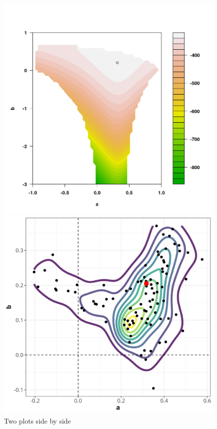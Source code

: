 \documentclass{article}
\numberwithin{equation}{section}
\begin{document}
\begin{figure}[H]
    \centering
    \begin{minipage}{0.55\textwidth}
        \centering
        \includegraphics[width=\textwidth]{plots/Rplot01.png}
    \end{minipage}
    \hfill
    \begin{minipage}{0.44\textwidth}
        \centering
        \includegraphics[width=\textwidth]{plots/044_bootstrap_density.png}
    \end{minipage}
    \caption{Two plots side by side}
    \label{fig:04_uncertainty}
\end{figure}
\end{document}
